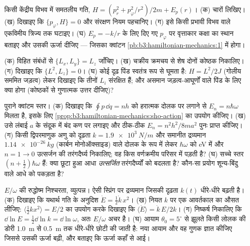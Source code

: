 \begin{exercise}[$\star\star$]\label{exo:b3:hamiltonian-mechanics:8}
किसी केंद्रीय विभव में समतलीय गति, $H = (p_r^2 + p_\varphi^2/r^2)/2m
+ E_p(r)$। (क) चारों  लिखिए। (ख) दिखाइए कि $\{
p_\varphi, H\} = 0$ और संरक्षण नियम पहचानिए। (ग) इसे किसी प्रभावी विभव
वाले एकविमीय त्रिज्य  तक घटाइए। (घ)
$E_p = -k/r$ के लिए दिए गए $p_\varphi$ पर वृत्ताकार कक्षा का स्थान
बताइए और उसकी ऊर्जा दीजिए --- जिसका क्वांटन
\cref{pb:b3:hamiltonian-mechanics:1} में होगा।
\end{exercise}

\begin{exercise}[$\star\star$]\label{exo:b3:hamiltonian-mechanics:9}
(क) विहित संबंधों से $\{L_x, L_y\} = L_z$ जाँचिए। (ख)
चक्रीय क्रमचय से शेष दोनों कोष्ठक निकालिए। (ग) दिखाइए कि
$\{L^2, L_z\} = 0$। (घ) कोई दृढ़ पिंड स्वतंत्र रूप से घूमता है:
$H =
L^2/2J$ (गोलीय सममित जड़त्व) लेकर दिखाइए कि तीनों $L_i$ संरक्षित हैं;
और असमान जड़त्व-आघूर्णों वाले पिंड के लिए क्या होगा (कोष्ठकों से
गुणात्मक उत्तर दीजिए)?
\end{exercise}

\begin{exercise}[$\star\star\star$]\label{exo:b3:hamiltonian-mechanics:10}
पुराने क्वांटम स्तर। (क) दिखाइए कि $\oint p\,\dd q = nh$ को
हरात्मक दोलक पर लगाने से $E_n = n\hbar\omega$ मिलता है, इसके लिए
\cref{prop:b3:hamiltonian-mechanics:sho-action} का उपयोग कीजिए। (ख)
उसे लंबाई $a$ के संदूक में बंद कण पर लगाइए और ठीक-ठीक $E_n =
n^2h^2/8ma^2$ पुनः प्राप्त कीजिए। (ग) किसी द्विपरमाणुक अणु को दृढ़ता
$k = \qty{1.9e3}{N/m}$ और समानीत द्रव्यमान $\qty{1.14e-26}
{kg}$ (कार्बन मोनोऑक्साइड) वाले दोलक के रूप में लेकर $\hbar\omega$ को
eV में और $n = 1 \to 0$ उत्सर्जन की तरंगदैर्घ्य निकालिए; वह किस
वर्णक्रमीय परिसर में पड़ती है? (घ) सच्चे स्तर $(n + \tfrac12)\hbar\omega$
हैं: क्या छूटा हुआ आधा \emph{उत्सर्जित} तरंगदैर्घ्यों को बदलता है? कौन-सा
प्रयोग शून्य-बिंदु वाले आधे को पकड़ता है?
\end{exercise}

\begin{exercise}[$\star\star\star$]\label{exo:b3:hamiltonian-mechanics:11}
$E/\omega$ की रुद्धोष्म निश्चरता, व्युत्पन्न। ऐसी स्प्रिंग पर द्रव्यमान
जिसकी दृढ़ता $k(t)$ धीरे-धीरे बढ़ती है। (क) दिखाइए कि यथार्थ गति के
अनुदिश $\dot E = \tfrac12\dot k\,
x^2$। (ख) नियत $k$ पर एक आवर्तकाल का औसत लीजिए:
$\langle\tfrac12 kx^2\rangle = E/2$ का उपयोग करके दिखाइए कि $\langle\dot E\rangle
= \dot k\,E/2k$। (ग) निष्कर्ष निकालिए कि $\dd\ln E = \tfrac12\dd\ln k = \dd\ln
\omega$, अतः $E/\omega$ अचर है। (घ) आयाम $\theta_0 = 5^\circ$ से
झूलते किसी लोलक की डोरी \qty{1.0}{m} से \qty{0.5}{m} तक धीरे-धीरे छोटी
की जाती है: नया आयाम और वह गुणक ज्ञात कीजिए जिससे उसकी ऊर्जा बढ़ी, और
बताइए कि ऊर्जा कहाँ से आई।
\end{exercise}

